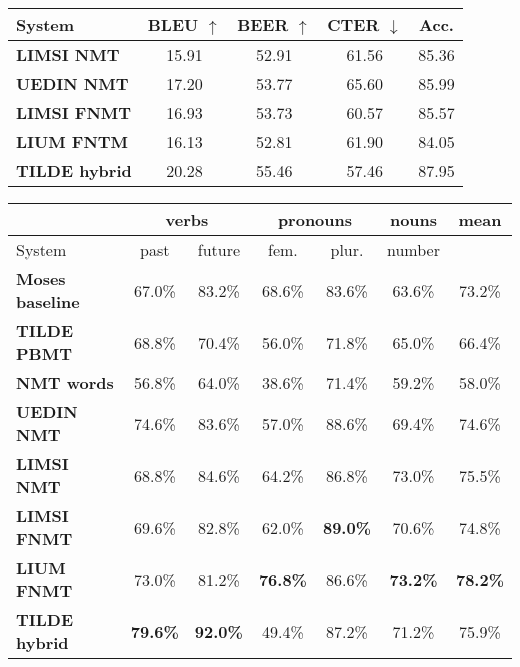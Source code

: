 \documentclass[11pt,letterpaper,final,nohyperref]{article}
\begin{document}
\begin{table*} %
\begin{minipage}{.40\linewidth}
\begin{center}
\scriptsize %
\begin{tabular}{ l|cccc } 
\hline
System & BLEU $\uparrow$ & BEER $\uparrow$ & CTER $\downarrow$ & Acc. \\
\hline
\textbf{LIMSI NMT}      & 15.91 & 52.91 & 61.56 & 85.36 \\
\textbf{UEDIN NMT}      & 17.20 & 53.77 & 65.60 & 85.99 \\
\textbf{LIMSI FNMT}     & 16.93 & 53.73 & 60.57 & 85.57 \\
\textbf{LIUM FNTM}      & 16.13 & 52.81 & 61.90 & 84.05 \\
\textbf{TILDE hybrid}   & 20.28 & 55.46 & 57.46 & 87.95 \\
\hline
\end{tabular} 
\caption{\label{tab:bleuLv} Scores of the English-to-Latvian WMT'17 submissions on the official test set.}
\end{center}
\end{minipage}
\hspace{7mm}
\begin{minipage}{.55\linewidth}
\begin{center}
\scriptsize %
\begin{tabular}{ l|cc|cc|c||c }
\hline
& \multicolumn{2}{c}{\textbf{verbs}} & \multicolumn{2}{c}{\textbf{pronouns}} & \multicolumn{1}{c}{\textbf{nouns}}  & \multicolumn{1}{c}{\textbf{mean}} \\
\hline
System & past & future & fem. & plur. & number & \\
\hline
\textbf{Moses baseline} & 67.0\% & 83.2\% & 68.6\% & 83.6\% & 63.6\% & 73.2\% \\
\textbf{TILDE PBMT}     & 68.8\% & 70.4\% & 56.0\% & 71.8\% & 65.0\% & 66.4\% \\
\textbf{NMT words}      & 56.8\% & 64.0\% & 38.6\% & 71.4\% &  59.2\% & 58.0\%\\
\textbf{UEDIN NMT}      & 74.6\% & 83.6\% & 57.0\% & 88.6\% & 69.4\% & 74.6\% \\
\textbf{LIMSI NMT}      & 68.8\% & 84.6\% & 64.2\% & 86.8\% & 73.0\% & 75.5\% \\
\textbf{LIMSI FNMT}     & 69.6\% & 82.8\% & 62.0\% & \textbf{89.0\%} & 70.6\% & 74.8\% \\
\textbf{LIUM FNMT}      & 73.0\% & 81.2\% & \textbf{76.8\%} & 86.6\% & \textbf{73.2\%} & \textbf{78.2\%} \\
\textbf{TILDE hybrid}   & \textbf{79.6\%} & \textbf{92.0\%} & 49.4\% & 87.2\% & 71.2\% & 75.9\% \\
\hline
 \end{tabular} 
\caption{\label{table:eval_lv_A} Sentence pair evaluation for English-to-Latvian (A-set).}
\end{center}
\end{minipage}
\end{table*}
\end{document}
